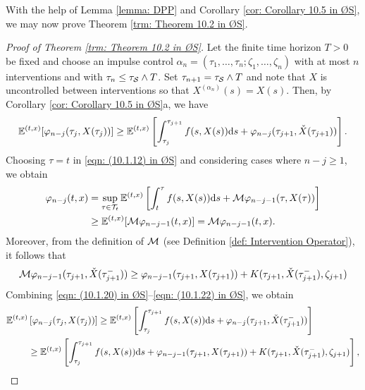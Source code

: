With the help of Lemma \ref{lemma: DPP} and Corollary \ref{cor: Corollary 10.5 in ØS}, we may now prove Theorem \ref{trm: Theorem 10.2 in ØS}.

\begin{proof}[Proof of Theorem \ref{trm: Theorem 10.2 in ØS}]
    Let the finite time horizon $T>0$ be fixed and choose an impulse control $\alpha_n = (\tau_1, \ldots, \tau_n; \zeta_1, \ldots, \zeta_n)$ with at most $n$ interventions and with $\tau_n \leq \tau_{\mathcal{S}} \wedge T$. Set $\tau_{n+1} = \tau_{\mathcal{S}} \wedge T$ and note that $X$ is uncontrolled between interventions so that $X^{(\alpha_n)}(s)=X(s)$. Then, by Corollary \ref{cor: Corollary 10.5 in ØS}a, we have
    \begin{equation}
        \mathbb{E}^{(t,x)} [\varphi_{n-j}(\tau_j, X(\tau_j))] \geq \mathbb{E}^{(t,x)} \left[ \int_{\tau_j}^{\tau_{j+1}} f(s,X(s)) \mathrm{d} s + \varphi_{n-j}(\tau_{j+1}, \check{X}(\tau_{j+1})) \right].
        \label{eqn: (10.1.20) in ØS}
    \end{equation}
    Choosing $\tau=t$ in \eqref{eqn: (10.1.12) in ØS} and considering cases where $n-j \geq 1$, we obtain
    \begin{align}
        \varphi_{n-j}(t,x) &= \sup_{\tau \in \mathcal{T}_t}\mathbb{E}^{(t,x)} \left[ \int_t^\tau f(s,X(s)) \mathrm{d} s + \mathcal{M} \varphi_{n-j-1} (\tau, X(\tau)) \right] \nonumber \\
        &\geq \mathbb{E}^{(t,x)} [\mathcal{M} \varphi_{n-j-1} (t,x)] = \mathcal{M} \varphi_{n-j-1} (t,x).
        \label{eqn: (10.1.21) in ØS}
    \end{align}
    Moreover, from the definition of $\mathcal{M}$ (see Definition \ref{def: Intervention Operator}), it follows that
    \begin{equation}
        \mathcal{M} \varphi_{n-j-1}(\tau_{j+1}, \check{X}(\tau_{j+1}^-)) \geq  \varphi_{n-j-1}(\tau_{j+1},X(\tau_{j+1})) + K(\tau_{j+1},\check{X}(\tau_{j+1}^-), \zeta_{j+1})
        \label{eqn: (10.1.22) in ØS}
    \end{equation}
    Combining \eqref{eqn: (10.1.20) in ØS}--\eqref{eqn: (10.1.22) in ØS},  we obtain
    \begin{align}
        \mathbb{E}^{(t,x)} & \left[ \varphi_{n-j}(\tau_j, X(\tau_j)) \right] \geq 
        \mathbb{E}^{(t,x)} \left[ \int_{\tau_j}^{\tau_{j+1}} f(s,X(s)) \mathrm{d} s + \varphi_{n-j}(\tau_{j+1}, \check{X}(\tau_{j+1}^-)) \right] \nonumber \\
        & \geq \mathbb{E}^{(t,x)} \left[ \int_{\tau_j}^{\tau_{j+1}} f(s,X(s)) \mathrm{d} s + \varphi_{n-j-1}(\tau_{j+1},X(\tau_{j+1})) + K(\tau_{j+1},\check{X}(\tau_{j+1}^-), \zeta_{j+1}) \right],
    \end{align}

\end{proof}
